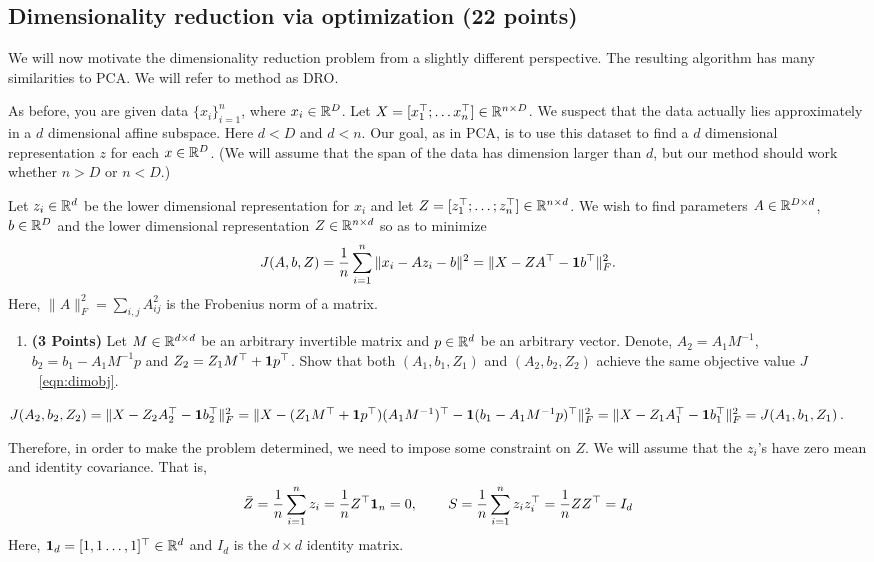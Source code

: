 \subsection{Dimensionality reduction via optimization (22 points)}

We will now motivate the dimensionality reduction problem from a slightly different
perspective. The resulting algorithm has many similarities to PCA.
We will refer to method as DRO.

As before, you are given data $\{x_i\}_{i=1}^n$, where $x_i \in \mathbb{R}^D$. Let $X=[x_1^\top; \dots
x_n^\top] \in \mathbb{R}^{n\times D}$. We suspect that the data
actually lies approximately in  a $d$ dimensional affine subspace.
Here $d<D$ and $d<n$.
Our goal, as in PCA, is to use this dataset to find a $d$ dimensional representation $z$ for each $x\in\mathbb{R}^D$.
(We will assume that the span of the data has dimension larger than
$d$, but our method should work whether $n>D$ or $n<D$.)


Let $z_i\in \mathbb{R}^d$ be the lower dimensional representation for $x_i$ and
let $Z = [z_1^\top; \dots; z_n^\top] \in \mathbb{R}^{n\times d}$.
We wish to find parameters $A \in \mathbb{R}^{D\times d}$, $b\in\mathbb{R}^D$ and the lower
dimensional representation $Z\in \mathbb{R}^{n\times d}$ so as to minimize 
\begin{equation}
J(A,b,Z) = \frac{1}{n} \sum_{i=1}^n \|x_i - Az_i - b\|^2 = \| X - ZA^\top - {\bf 1} b^\top\|_F^2.
\label{eqn:dimobj}
\end{equation}
Here, $\|A\|^2_F = \sum_{i,j} A_{ij}^2$ is the Frobenius norm of a matrix.


\begin{enumerate}
\item \textbf{(3 Points)}
Let $M\in\mathbb{R}^{d\times d}$ be an arbitrary invertible matrix and $p\in\mathbb{R}^{d}$ be an arbitrary vector.
Denote, $A_2 = A_1M^{-1}$, $b_2 = b_1- A_1M^{-1}p$ and $Z_2 = Z_1 M^\top +
{\bf 1} p^\top$.
Show that both
$(A_1, b_1, Z_1)$ and $(A_2, b_2, Z_2)$ achieve the same objective value $J$~\eqref{eqn:dimobj}.
\end{enumerate}

\begin{soln}
  $J(A_2, b_2, Z_2) = \| X - Z_2A_2^\top - {\bf 1} b_2^\top\|_F^2 = \| X - (Z_1 M^\top +
  {\bf 1} p^\top)(A_1M^{-1})^\top - {\bf 1} (b_1- A_1M^{-1}p)^\top\|_F^2 = \| X - Z_1A_1^\top - {\bf 1} b_1^\top\|_F^2 = J(A_1, b_1, Z_1)$.
\end{soln}

Therefore, in order to make the problem determined, we need to impose some
constraint on $Z$. We will assume that the $z_i$'s have zero mean and identity covariance.
That is,
\begin{align*}
\bar{Z} = \frac{1}{n} \sum_{i=1}^n z_i =\frac{1}{n} Z^\top {\bf 1}_n = 0, \hspace{0.3in} 
S = \frac{1}{n} \sum_{i=1}^n z_i z_i^\top 
= \frac{1}{n} Z Z^\top
= I_d
\end{align*}
Here, ${\bf 1}_d = [1, 1 \dots, 1]^\top \in\mathbb{R}^d$ and $I_d$  is the $d\times d$ identity matrix.

